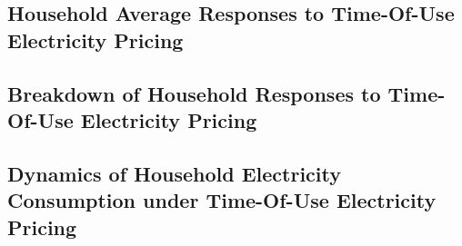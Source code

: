 \subsection{Household Average Responses to Time-Of-Use Electricity Pricing}
\label{Subsection:Household-Average-Responses-to-Time-Of-Use-Electricity-Pricing}



\subsection{Breakdown of Household Responses to Time-Of-Use Electricity Pricing}
\label{Subsection:Breakdown-of-Responses-to-Time-Of-Use-Electricity-Pricing}



\subsection{Dynamics of Household Electricity Consumption under Time-Of-Use Electricity Pricing}
\label{Subsection:Dynamics-of-Household-Electricity-Consumption-under-Time-Of-Use-Electricity-Pricing}

